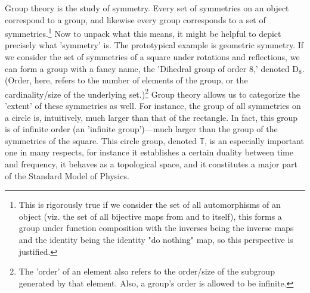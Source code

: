 \documentclass[11pt, a4paper]{report}
\begin{document}
Group theory is the study of symmetry. Every set of symmetries on an object correspond to a group, and likewise every group corresponds to a set of symmetries.\footnote[0]{This is rigorously true if we consider the set of all automorphisms of an object (viz. the set of all bijective maps from and to itself), this forms a group under function composition with the inverses being the inverse maps and the identity being the identity "do nothing" map, so this perspective is justified.} %
Now to unpack what this means, it might be helpful to depict precisely what 'symmetry' is. The prototypical example is geometric symmetry. If we consider the set of symmetries of a square under rotations and reflections, we can form a group with a fancy name, the 'Dihedral group of order 8,' denoted $\mathrm{D}_8$. %
(Order, here, refers to the number of elements of the group, or the cardinality/size of the underlying set.)\footnote[0]{The 'order' of an element also refers to the order/size of the subgroup generated by that element. Also, a group's order is allowed to be infinite.}
Group theory allows us to categorize the 'extent' of these symmetries as well. For instance, the group of all symmetries on a circle is, intuitively, much larger than that of the rectangle. In fact, this group is of infinite order (an 'infinite group')—much larger than the group of the symmetries of the square. This circle group, denoted $\mathbb{T}$, is an especially important one in many respects, for instance it establishes a certain duality between time and frequency, it behaves as a topological space, and it constitutes a major part of the Standard Model of Physics.
\end{document}
